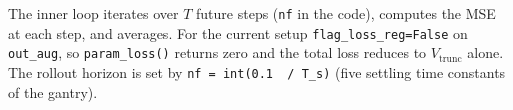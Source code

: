 \documentclass[11pt,a4paper]{article}
\newcommand{\code}[1]{\texttt{#1}}
\begin{document}
The inner loop iterates over $T$ future steps (\code{nf} in the code),
computes the MSE at each step, and averages.
For the current setup \code{flag\_loss\_reg=False} on \code{out\_aug},
so \code{param\_loss()} returns zero and the total loss reduces to
$V_{\mathrm{trunc}}$ alone.
The rollout horizon is set by \code{nf = int(0.1\, / T_s)}
(five settling time constants of the gantry).
\end{document}
